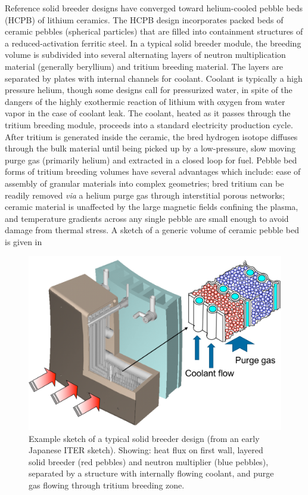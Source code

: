 Reference solid breeder designs have converged toward helium-cooled pebble beds (HCPB) of lithium ceramics.  The HCPB design incorporates packed beds of ceramic pebbles (spherical particles) that are filled into containment structures of a reduced-activation ferritic steel. In a typical solid breeder module, the breeding volume is subdivided into several alternating layers of neutron multiplication material (generally beryllium) and tritium breeding material. The layers are separated by plates with internal channels for coolant. Coolant is typically a high pressure helium, though some designs call for pressurized water, in spite of the dangers of the highly exothermic reaction of lithium with oxygen from water vapor in the case of coolant leak. The coolant, heated as it passes through the tritium breeding module, proceeds into a standard electricity production cycle. After tritium is generated inside the ceramic, the bred hydrogen isotope diffuses through the bulk material until being picked up by a low-pressure, slow moving purge gas (primarily helium) and extracted in a closed loop for fuel. Pebble bed forms of tritium breeding volumes have several advantages which include: ease of assembly of granular materials into complex geometries; bred tritium can be readily removed \textit{via} a helium purge gas through interstitial porous networks; ceramic material is unaffected by the large magnetic fields confining the plasma, and temperature gradients across any single pebble are small enough to avoid damage from thermal stress. A sketch of a generic volume of ceramic pebble bed is given in 

\begin{figure}[ht]
	\centering
	\includegraphics[width=\singleimagewidth]{figures/JP-solid-breeder-sketch} 
	\caption{Example sketch of a typical solid breeder design (from an early Japanese ITER sketch). Showing: heat flux on first wall, layered solid breeder (red pebbles) and neutron multiplier (blue pebbles), separated by a structure with internally flowing coolant, and purge gas flowing through tritium breeding zone.}
	\label{fig:solid-breeder-sketch}
\end{figure}


